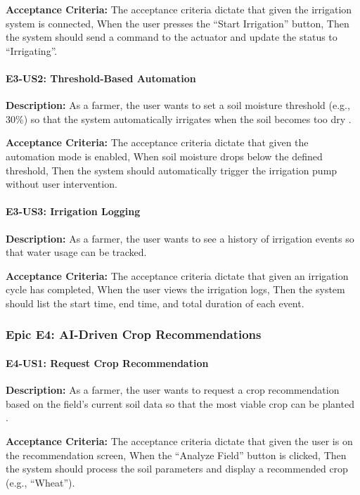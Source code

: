 \textbf{Acceptance Criteria:} The acceptance criteria dictate that given the irrigation system is connected, When the user presses the ``Start Irrigation'' button, Then the system should send a command to the actuator and update the status to ``Irrigating''.


\paragraph{E3-US2: Threshold-Based Automation}

\textbf{Description:} As a farmer, the user wants to set a soil 
moisture threshold (e.g., 30\%) so that the system automatically 
irrigates when the soil becomes too dry \cite{garcia2020iot}.

\textbf{Acceptance Criteria:} The acceptance criteria dictate that given the automation mode is enabled, When soil moisture drops below the defined threshold, Then the system should automatically trigger the irrigation pump without user intervention.


\paragraph{E3-US3: Irrigation Logging}

\textbf{Description:} As a farmer, the user wants to see a history 
of irrigation events so that water usage can be tracked.

\textbf{Acceptance Criteria:} The acceptance criteria dictate that given an irrigation cycle has completed, When the user views the irrigation logs, Then the system should list the start time, end time, and total duration of each event.


\subsubsection{Epic E4: AI-Driven Crop Recommendations}

\paragraph{E4-US1: Request Crop Recommendation}

\textbf{Description:} As a farmer, the user wants to request a crop 
recommendation based on the field's current soil data so that the 
most viable crop can be planted \cite{musanase2023data}.

\textbf{Acceptance Criteria:} The acceptance criteria dictate that given the user is on the recommendation screen, When the ``Analyze Field'' button is clicked, Then the system should process the soil parameters and display a recommended crop (e.g., ``Wheat'').


